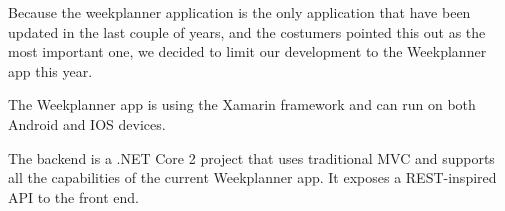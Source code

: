 Because the weekplanner application is the only application that have been updated in the last couple of years, and the costumers pointed this out as the most important one, we decided to limit our development to the Weekplanner app this year.

The Weekplanner app is using the Xamarin framework and can run on both Android and IOS devices.

The backend is a .NET Core 2 project that uses traditional MVC and supports all the capabilities of the current Weekplanner app. It exposes a REST-inspired API to the front end.
